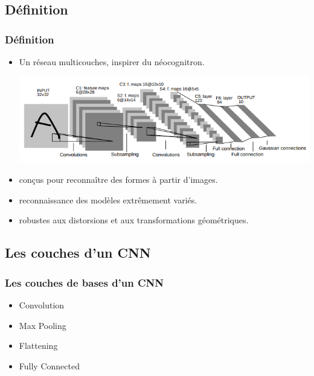 \documentclass[11pt]{beamer}
\begin{document}
\subsection{Définition}
\begin{frame}
\frametitle{Définition}
\begin{itemize}
\item Un réseau multicouches, inspirer du néocognitron.
\begin{center}
	\includegraphics[scale=0.35]{img25.png}
\end{center}
\item conçus pour reconnaître des formes à partir d’images.
\item reconnaissance des modèles extrêmement variés. 
\item robustes aux distorsions et aux transformations géométriques.
\end{itemize}
\end{frame}

\subsection{Les couches d'un CNN}
\begin{frame}
\frametitle{Les couches de bases d'un CNN}
\begin{itemize}
	\item Convolution 
	\item Max Pooling
	\item Flattening
	\item Fully Connected
\end{itemize}
\end{frame}
\end{document}
